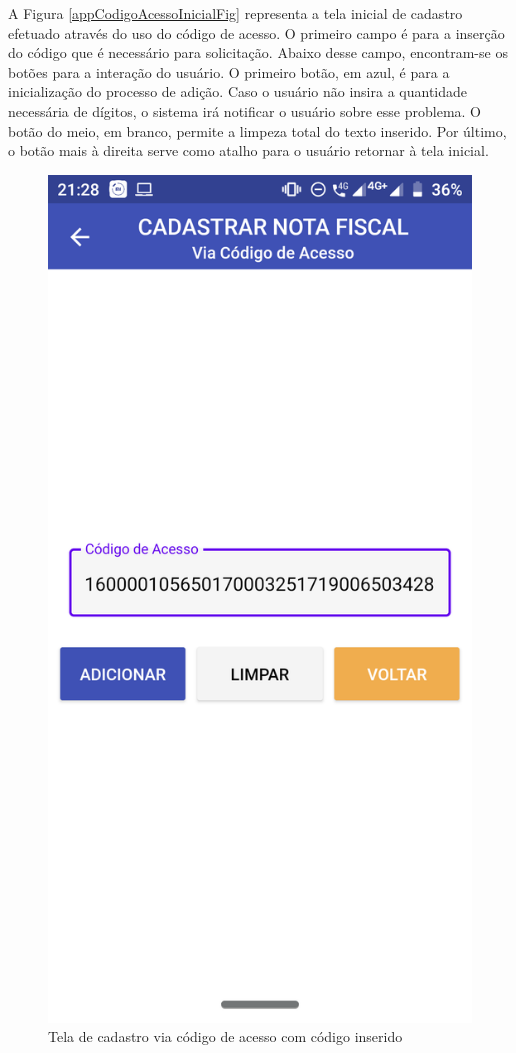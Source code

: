A Figura \ref{appCodigoAcessoInicialFig} representa a tela inicial de cadastro efetuado através do uso do código de acesso. O primeiro campo é para a inserção do código que é necessário para solicitação. Abaixo desse campo, encontram-se os botões para a interação do usuário. O primeiro botão, em azul, é para a inicialização do processo de adição. Caso o usuário não insira a quantidade necessária de dígitos, o sistema irá notificar o usuário sobre esse problema. O botão do meio, em branco, permite a limpeza total do texto inserido. Por último, o botão mais à direita serve como atalho para o usuário retornar à tela inicial.

\newpage
\begin{figure}[h]
    \centering
    \caption{Tela de cadastro via código de acesso com código inserido}
    \includegraphics[scale=0.15]{tcc/figures/app/app_codigo_acesso_com_codigo.png}

\end{figure}
